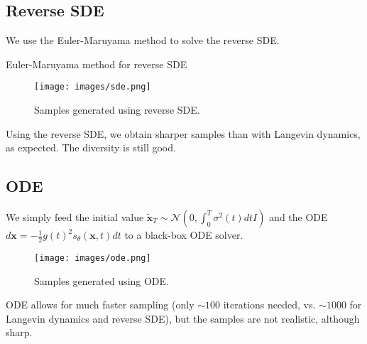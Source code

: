 \documentclass{article}
\begin{document}
\subsection{Reverse SDE}
We use the Euler-Maruyama method to solve the reverse SDE.
\begin{algorithm}[H]
	\caption{Euler-Maruyama method for reverse SDE}
	\label{alg:reverse-sde}
	\begin{algorithmic}[1]
        \EndFor
        \item[]
	\end{algorithmic}
\end{algorithm}

\begin{figure}[H]
    \centering
    \texttt{[image: images/sde.png]}
    \caption{Samples generated using reverse SDE.}
    \label{fig:sde}
\end{figure}

Using the reverse SDE, we obtain sharper samples than with Langevin dynamics, as expected. The diversity is still good.

\subsection{ODE}
We simply feed the initial value $\tilde{\mathbf{x}}_T \sim \mathcal{N}(0, \int_0^T \sigma^2(t)dt I)$ and the ODE $d\mathbf{x} = -\frac{1}{2}g(t)^2 s_\theta(\mathbf{x}, t)dt$ to a black-box ODE solver.

\begin{figure}[H]
    \centering
    \texttt{[image: images/ode.png]}
    \caption{Samples generated using ODE.}
    \label{fig:ode}
\end{figure}

ODE allows for much faster sampling (only $\sim100$ iterations needed, vs. $\sim1000$ for Langevin dynamics and reverse SDE), but the samples are not realistic, although sharp.
\end{document}
